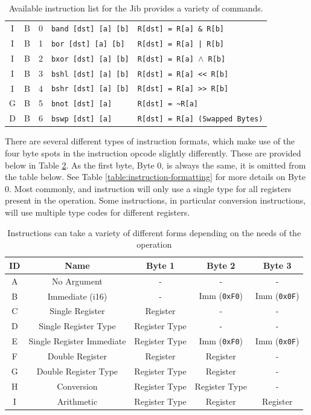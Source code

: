 \documentclass{article}
\begin{document}
\begin{table}[h!]
\begin{footnotesize}
\begin{tabular}{c|cc|l|l}
			I & B & 0 & \texttt{band [dst] [a] [b]} & \texttt{R[dst] = R[a] \& R[b]} \\
			I & B & 1 & \texttt{bor [dst] [a] [b]} & \texttt{R[dst] = R[a] | R[b]} \\
			I & B & 2 & \texttt{bxor [dst] [a] [b]} & \texttt{R[dst] = R[a] $\wedge$ R[b]} \\
			I & B & 3 & \texttt{bshl [dst] [a] [b]} & \texttt{R[dst] = R[a] << R[b]} \\
			I & B & 4 & \texttt{bshr [dst] [a] [b]} & \texttt{R[dst] = R[a] >> R[b]} \\
			G & B & 5 & \texttt{bnot [dst] [a]} & \texttt{R[dst] = \textasciitilde R[a]} \\
			D & B & 6 & \texttt{bswp [dst] [a]} & \texttt{R[dst] = R[a] (Swapped Bytes)} \\
			\hline
		\end{tabular}
	\end{footnotesize}
	\caption{Available instruction list for the Jib provides a variety of commands.}
	\label{table:instruction-table}
\end{table}

There are several different types of instruction formats, which make use of the four byte spots in the instruction opcode slightly differently. These are provided below in Table \ref{table:instruction-format-types}. As the first byte, Byte 0, is always the same, it is omitted from the table below. See Table \ref{table:instruction-formatting} for more details on Byte 0. Most commonly, and instruction will only use a single type for all registers present in the operation. Some instructions, in particular conversion instructions, will use multiple type codes for different registers.

\begin{table}[h!]
	\centering
	\begin{tabular}{cc|ccc}
		\hline
		ID & Name & Byte 1 & Byte 2 & Byte 3 \\
		\hline
		A & No Argument & - & - & - \\
		B & Immediate (i16) & - & Imm (\texttt{0xF0}) & Imm (\texttt{0x0F}) \\
		C & Single Register & Register & - & - \\
		D & Single Register Type & Register Type & - & - \\
		E & Single Register Immediate & Register Type & Imm (\texttt{0xF0}) & Imm (\texttt{0x0F}) \\
		F & Double Register & Register & Register & - \\
		G & Double Register Type & Register Type & Register & - \\
		H & Conversion & Register Type & Register Type & - \\
		I & Arithmetic & Register Type & Register & Register \\
		\hline
	\end{tabular}
	\caption{Instructions can take a variety of different forms depending on the needs of the operation}
	\label{table:instruction-format-types}
\end{table}
\end{document}
